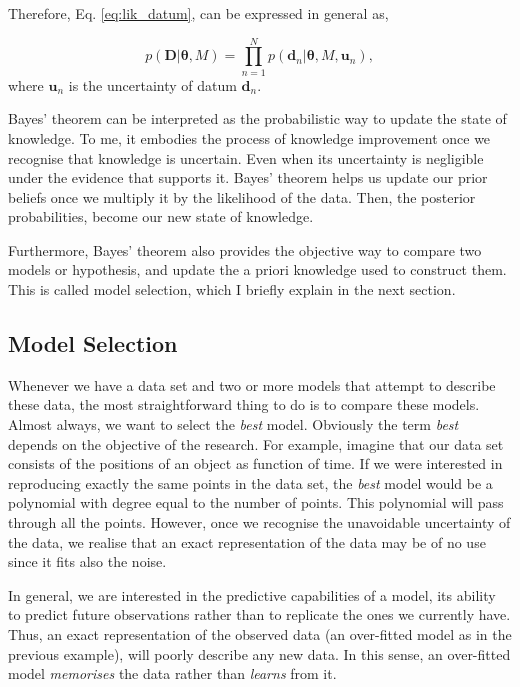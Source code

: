 Therefore, Eq. \ref{eq:lik_datum}, can be expressed in general as,

\begin{equation}
\label{eq:lik_generativemodel}
p(\mathbf{D}|\boldsymbol{\theta},M) = \prod_{n=1}^N p(\mathbf{d}_n|\boldsymbol{\theta},M,\mathbf{u}_n),
\end{equation}
where $\mathbf{u}_n$ is the uncertainty of datum $\mathbf{d}_n$.


Bayes' theorem can be interpreted as the probabilistic way to update the state of knowledge. To me, it embodies the process of knowledge improvement once we recognise that knowledge is uncertain. Even when its uncertainty is negligible under the evidence that supports it. Bayes' theorem helps us update our prior beliefs once we multiply it by the likelihood of the data. Then, the posterior probabilities, become our new state of knowledge. 

Furthermore, Bayes' theorem also provides the objective way to compare two models or hypothesis, and update the a priori knowledge used to construct them. This is called model selection, which I  briefly explain in the next section.

\subsection{Model Selection}
\label{sect:modelselection}

Whenever we have a data set and two or more models that attempt to describe these data, the most straightforward thing to do is to compare these models. Almost always, we want to select the \emph{best} model. Obviously the term \emph{best} depends on the objective of the research. For example, imagine that our data set consists of the positions of an object as function of time. If we were interested in reproducing exactly the same points in the data set, the \emph{best} model would be a polynomial with degree equal to the number of points. This polynomial will pass through all the points. However, once we recognise the unavoidable uncertainty of the data, we realise that an exact representation of the data may be of no use since it fits also the noise. 

In general, we are interested in the predictive capabilities of a model, its ability to predict future observations rather than to replicate the ones we currently have. Thus, an exact representation of the observed data (an over-fitted model as in the previous example), will poorly describe any new data. In this sense, an over-fitted model \emph{memorises} the data rather than \emph{learns} from it.

